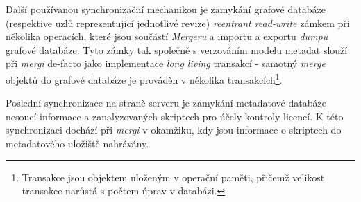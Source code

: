 Další používanou synchronizační mechanikou je zamykání grafové databáze (respektive uzlů reprezentující jednotlivé revize) \textit{reentrant read-write} zámkem při několika operacích, které jsou součástí \textit{Mergeru} a importu a exportu \textit{dumpu} grafové databáze. Tyto zámky tak společně s verzováním modelu metadat slouží při \textit{mergi} de-facto jako implementace \textit{long living} transakcí - samotný \textit{merge} objektů do grafové databáze je prováděn v několika transakcích\footnote{Transakce jsou objektem uloženým v operační paměti, přičemž velikost transakce narůstá s počtem úprav v databázi.}.

Poslední synchronizace na straně serveru je zamykání metadatové databáze nesoucí informace a zanalyzovaných skriptech pro účely kontroly licencí. K této synchronizaci dochází při \textit{mergi} v okamžiku, kdy jsou informace o skriptech do metadatového uložiště nahrávány.


